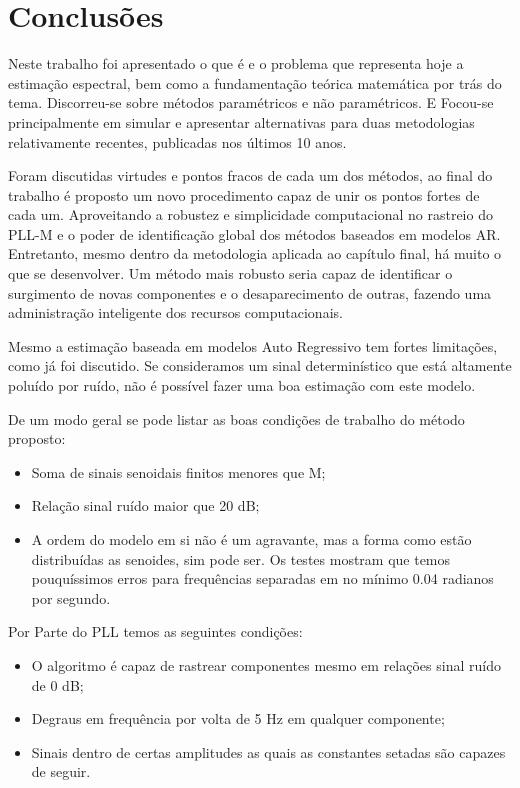 \section{Conclusões}
Neste trabalho foi apresentado o que é e o problema que representa hoje a estimação espectral, bem como a fundamentação teórica matemática por trás do tema. Discorreu-se sobre métodos paramétricos e não paramétricos. E Focou-se principalmente em simular e apresentar alternativas para duas metodologias relativamente recentes, publicadas nos últimos 10 anos. 

Foram discutidas virtudes e pontos fracos de cada um dos métodos, ao final do trabalho é proposto um novo procedimento capaz de unir os pontos fortes de cada um. Aproveitando a robustez e simplicidade computacional no rastreio do PLL-M e o poder de identificação global dos métodos baseados em modelos AR. Entretanto, mesmo dentro da metodologia aplicada ao capítulo final, há muito o que se desenvolver. Um método mais robusto seria capaz de identificar o surgimento de novas componentes e o desaparecimento de outras, fazendo uma administração inteligente dos recursos computacionais.

Mesmo a estimação baseada em modelos Auto Regressivo tem fortes limitações, como já foi discutido. Se consideramos um sinal determinístico que está altamente poluído por ruído, não é possível fazer uma boa estimação com este modelo. 

De um modo geral se pode listar as boas condições de trabalho do método proposto:

\begin{itemize}
	\item Soma de sinais senoidais finitos menores que M; 
	\item Relação sinal ruído maior que 20 dB;
	\item A ordem do modelo em si não é um agravante, mas a forma como estão distribuídas as senoides, sim pode ser. Os testes mostram que temos pouquíssimos erros para frequências separadas em no mínimo 0.04 radianos por segundo.
\end{itemize}

Por Parte do PLL temos as seguintes condições:
\begin{itemize}
	\item O algoritmo é capaz de rastrear componentes mesmo em relações sinal ruído de 0 dB;
	\item Degraus em frequência por volta de 5 Hz em qualquer componente; 
	\item Sinais dentro de certas amplitudes as quais as constantes setadas são capazes de seguir.
\end{itemize}

